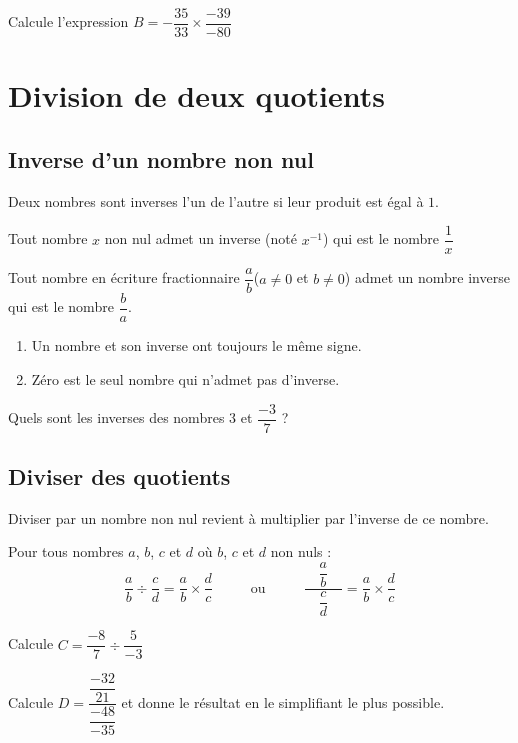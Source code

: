 \documentclass[a4paper,10pt]{report}
\begin{document}
\begin{ex}
Calcule l'expression $B=-\dfrac{35}{33} \times \dfrac{-39}{-80}$

\noindent\grandscarreaux{\linewidth}{4.8cm}
\end{ex}

\section{Division de deux quotients}

\subsection{Inverse d'un nombre non nul}

\begin{defn}
Deux nombres sont inverses l'un de l'autre si leur produit est égal à $1$.
\end{defn}

\begin{prop}
Tout nombre $x$ non nul admet un inverse (noté $x^{-1}$) qui est le nombre $\dfrac{1}{x}$

\noindent Tout nombre en écriture fractionnaire $\dfrac{a}{b}$($a\neq 0$ et $b \neq 0$) admet un nombre inverse qui est le nombre $\dfrac{b}{a}$.
\end{prop}

\begin{rem}
\begin{enumerate}
\item[•] Un nombre et son inverse ont toujours le même signe.
\item[•] Zéro est le seul nombre qui n'admet pas d'inverse.
\end{enumerate}
\end{rem}

\begin{ex}
Quels sont les inverses des nombres $3$ et $\dfrac{-3}{7}$ ?

\noindent\grandscarreaux{\linewidth}{2.4cm}
\end{ex}

\subsection{Diviser des quotients}

\begin{memento}
Diviser par un nombre non nul revient à multiplier par l'inverse de ce nombre.

\medskip
\noindent 
Pour tous nombres $a$, $b$, $c$ et $d$ où $b$, $c$ et $d$ non nuls :
$$\dfrac{a}{b} \div \dfrac{c}{d} = \dfrac{a}{b} \times \dfrac{d}{c}  \hspace{1cm} \text{ ou } \hspace{1cm} \dfrac{\quad \dfrac{a}{b} \quad }{\dfrac{c}{d}}= \dfrac{a}{b} \times \dfrac{d}{c} $$
\end{memento}

\begin{ex}
Calcule $C=\dfrac{-8}{7} \div \dfrac{5}{-3}$

\noindent\grandscarreaux{\linewidth}{6.4cm}
\end{ex}

\begin{ex}
Calcule $D=\dfrac{\dfrac{-32}{21}}{\dfrac{-48}{-35}}$ et donne le résultat en le simplifiant le plus possible.

\noindent\grandscarreaux{\linewidth}{6.4cm}
\end{ex}
\end{document}
